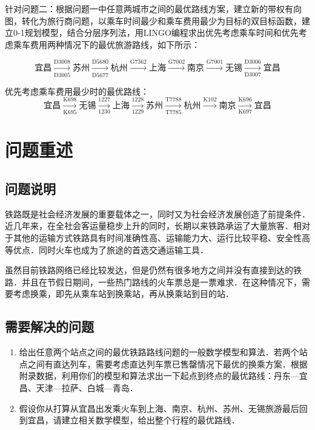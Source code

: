 \documentclass[nocover]{cumcmart}%
\begin{document}
\begin{cnabstract}
针对问题二：根据问题一中任意两城市之间的最优路线方案，建立新的带权有向图，转化为旅行商问题，以乘车时间最少和乘车费用最少为目标的双目标函数，建立0-1规划模型，结合分层序列法，用LINGO编程求出优先考虑乘车时间和优先考虑乘车费用两种情况下的最优旅游路线，如下所示：

\[
\text{宜昌} \xrightarrow[\text{D3005}]{\text{D3008}} \text{苏州} \xrightarrow[\text{D5677}]{\text{D5680}} \text{杭州} \xrightarrow{\text{G7362}} \text{上海} \xrightarrow{\text{G7002}} \text{南京} \xrightarrow{\text{G7001}} \text{无锡} \xrightarrow[\text{D3007}]{\text{D3006}} \text{宜昌}
\]

优先考虑乘车费用最少时的最优路线：
\[
\text{宜昌} \xrightarrow[\text{K695}]{\text{K698}} 
\text{无锡} \xrightarrow[\text{1230}]{\text{1227}} 
\text{上海} \xrightarrow[\text{1229}]{\text{1228}} 
\text{苏州} \xrightarrow[\text{T7785}]{\text{T7788}} 
\text{杭州} \xrightarrow{\text{K102}} 
\text{南京} \xrightarrow[\text{K697}]{\text{K696}} 
\text{宜昌}
\]

\end{cnabstract}

\newpage


\section{问题重述}
\subsection{问题说明}
铁路既是社会经济发展的重要载体之一，同时又为社会经济发展创造了前提条件．近几年来，在全社会客运量稳步上升的同时，长期以来铁路承运了大量旅客．相对于其他的运输方式铁路具有时间准确性高、运输能力大、运行比较平稳、安全性高等优点．同时火车也成为了旅途的首选交通运输工具．

虽然目前铁路网络已经比较发达，但是仍然有很多地方之间并没有直接到达的铁路．并且在节假日期间，一些热门路线的火车票总是一票难求．在这种情况下，需要考虑换乘，即先从乘车站到换乘站，再从换乘站到目的站．

\subsection{需要解决的问题}
\begin{enumerate}
  \item 给出任意两个站点之间的最优铁路路线问题的一般数学模型和算法．若两个站点之间有直达列车，需要考虑直达列车票已售罄情况下最优的换乘方案．根据附录数据，利用你们的模型和算法求出一下起点到终点的最优路线：丹东---宜昌、天津---拉萨、白城---青岛．
  \item 假设你从打算从宜昌出发乘火车到上海、南京、杭州、苏州、无锡旅游最后回到宜昌，请建立相关数学模型，给出整个行程的最优路线．
\end{enumerate}
\end{document}
